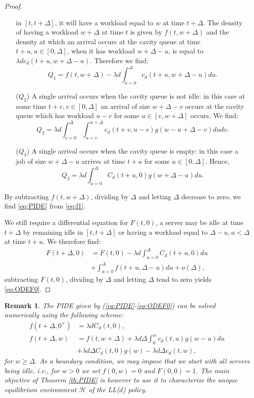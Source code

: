 \documentclass[12pt]{report}
\newtheorem{remark}{Remark}
\begin{document}
\begin{proof}
\begin{enumerate}
in $[t,t+\Delta]$, it will have a workload equal to $w$ at time $t+\Delta$. The density of having a workload $w+\Delta$ at time $t$ is given by $f(t,w+\Delta)$ and the density at which an arrival occurs at the cavity queue at time $t+u, u \in [0,\Delta]$, when it has workload $w+\Delta-u$,
is equal to $\lambda d c_d(t+u, w + \Delta - u)$. Therefore we find:
$$
Q_1 = f(t, w + \Delta) - \lambda d \int_{u=0}^{\Delta} c_d(t+u,w+\Delta - u) du.
$$
\item[($Q_2$)]A single arrival occurs when the cavity queue is not idle: in this case at some time $t+v, v \in [0,\Delta]$ an arrival of size $w+\Delta-v$ occurs at 
the cavity queue which has workload $u-v$ for some $u \in [v,w+\Delta]$ occurs. We find:
$$
Q_2 = \lambda d  \int_{v=0}^{\Delta} \int_{u=v}^{w+\Delta} c_d(t+v, u-v) g(w-u+\Delta-v)dudv.
$$
\item[($Q_3$)] A single arrival occurs when the cavity queue is empty: in this case a job 
of size $w + \Delta - u$ arrives at time $t+u$ for some $u \in [0,\Delta]$. Hence,
$$
Q_3 = \lambda d \int_{u=0}^{\Delta} C_d(t+u, 0) g(w+\Delta-u)du.
$$
\end{enumerate}
By subtracting $f(t,w+\Delta)$, dividing by $\Delta$ and letting  $\Delta$ decrease to zero, we find \eqref{eq:PIDE} from \eqref{eq:f1}.

We still require a differential equation for $F(t,0)$, a server may be idle at time $t+\Delta$ by remaining idle in $[t,t+\Delta]$ or having a workload equal to $\Delta - u, u < \Delta$ at time $t + u$. We therefore find:
\begin{align}
F(t+\Delta, 0) &= F(t,0) - \lambda d \int_{u = 0}^{\Delta}C_d(t+u,0)du\\
& + \int_{u=0}^{\Delta} f(t+u, \Delta - u) du + o(\Delta), \label{eq:empty_queue_thm1}
\end{align}
subtracting $F(t,0)$, dividing by $\Delta$ and letting $\Delta$ tend to zero yields \eqref{eq:ODEF0}.
\end{proof}

\begin{remark}
The PIDE given by (\ref{eq:PIDE}-\ref{eq:ODEF0}) can be solved numerically using the following scheme:
\begin{align*}
f(t+\Delta,0^+) &=
\lambda d C_d(t,0),\\
f(t+\Delta,w) &=
f(t,w+\Delta) + \lambda d \Delta \int_0^w c_d(t,u) g(w-u) du \\
&  + \lambda d \Delta  C_d(t,0) g(w) - \lambda d \Delta  c_d(t,w),
\end{align*}
for $w \geq \Delta$. As a boundary condition, we may impose that we start with all servers being idle, 
i.e., for $w>0$ we set $f(0,w) = 0$ and $F(0,0) = 1$.
The main objective of Theorem \ref{th:PIDE} is however to use it to characterize the unique equilibrium 
environment  $\mathcal{H}$ of the LL($d$) policy.
\end{remark}
\end{document}
